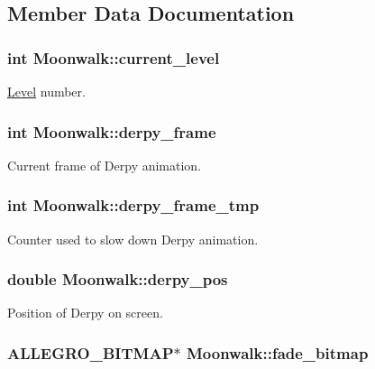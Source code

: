 \subsection{\-Member \-Data \-Documentation}
\hypertarget{structMoonwalk_a841870902dfd149bb19576a64e0ae8bf}{
\subsubsection[{current\-\_\-level}]{\setlength{\rightskip}{0pt plus 5cm}int {\bf \-Moonwalk\-::current\-\_\-level}}}\label{structMoonwalk_a841870902dfd149bb19576a64e0ae8bf}
\hyperlink{structLevel}{\-Level} number. \hypertarget{structMoonwalk_a4a3874c58e11745d4896b004861e1555}{
\subsubsection[{derpy\-\_\-frame}]{\setlength{\rightskip}{0pt plus 5cm}int {\bf \-Moonwalk\-::derpy\-\_\-frame}}}\label{structMoonwalk_a4a3874c58e11745d4896b004861e1555}
\-Current frame of \-Derpy animation. \hypertarget{structMoonwalk_ab087ba01cd2a107286ec8f75f58c676c}{
\subsubsection[{derpy\-\_\-frame\-\_\-tmp}]{\setlength{\rightskip}{0pt plus 5cm}int {\bf \-Moonwalk\-::derpy\-\_\-frame\-\_\-tmp}}}\label{structMoonwalk_ab087ba01cd2a107286ec8f75f58c676c}
\-Counter used to slow down \-Derpy animation. \hypertarget{structMoonwalk_a69689c77a64928bfb52c1dc1e1f7b33f}{
\subsubsection[{derpy\-\_\-pos}]{\setlength{\rightskip}{0pt plus 5cm}double {\bf \-Moonwalk\-::derpy\-\_\-pos}}}\label{structMoonwalk_a69689c77a64928bfb52c1dc1e1f7b33f}
\-Position of \-Derpy on screen. \hypertarget{structMoonwalk_adfea9d8976238abf5d94a797df7ee929}{
\subsubsection[{fade\-\_\-bitmap}]{\setlength{\rightskip}{0pt plus 5cm}\-A\-L\-L\-E\-G\-R\-O\-\_\-\-B\-I\-T\-M\-A\-P$\ast$ {\bf \-Moonwalk\-::fade\-\_\-bitmap}}}\label{structMoonwalk_adfea9d8976238abf5d94a797df7ee929}
